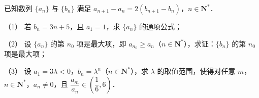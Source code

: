 \begin{question}
已知数列 \(\{a_{n}\}\) 与 \(\{b_{n}\}\) 满足 \(a_{n+1}-a_{n}=2(b_{n+1}-b_{n})\)，\(n\in\mathbf{N}^{*}\)．

（1） 若 \(b_{n}=3n+5\)，且 \(a_{1}=1\)，求 \(\{a_{n}\}\) 的通项公式；

（2） 设 \(\{a_{n}\}\) 的第 \(n_{0}\) 项是最大项，即 \(a_{n_{0}}\geqslant a_{n}\)（\(n\in\mathbf{N}^{*}\)），求证：\(\{b_{n}\}\) 的第 \(n_{0}\) 项是最大项；

（3） 设 \(a_{1}=3\lambda<0\)，\(b_{n}=\lambda^{n}\)（\(n\in\mathbf{N}^{*}\)），求 \(\lambda\) 的取值范围，使得对任意 \(m\)，\(n\in\mathbf{N}^{*}\)，\(a_{n}\neq0\)，且 \(\dfrac{a_{m}}{a_{n}}\in\left(\dfrac{1}{6},6\right)\)．

\end{question}